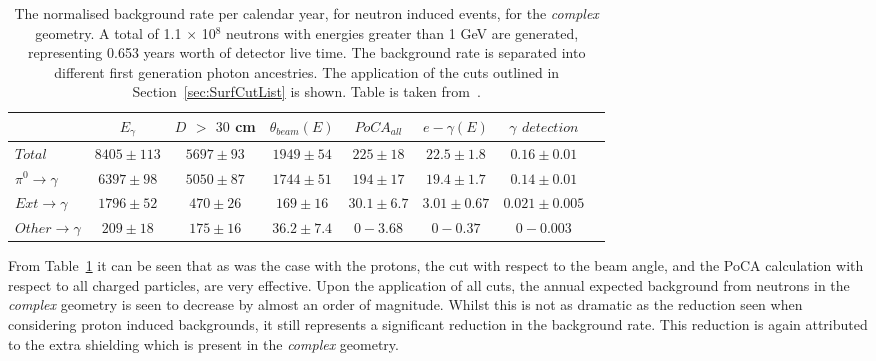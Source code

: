 \begin{table}
  \caption[The normalised background rate per calendar year, for neutron induced events, for the \emph{complex} geometry]
          {The normalised background rate per calendar year, for neutron induced events, for the \emph{complex} geometry. A total of 1.1 $\times$ 10$^8$ neutrons with energies greater than 1 GeV are generated, representing 0.653 years worth of detector live time. The background rate is separated into different first generation photon ancestries. The application of the cuts outlined in Section~\ref{sec:SurfCutList} is shown. Table is taken from~\citep{MartinsThesis}.}
  \label{tab:SurfNeuComp}
  \centering
  \scriptsize
  \begin{tabular}{l c c c c c c c }
    \toprule
        & $E_\gamma$ &  $D$ $>$ $30$ cm & $\theta_{beam}(E)$ & $PoCA_{all}$ & $e-\gamma(E)$ & $\gamma$ $detection$ \\
        \midrule
        $Total$          & $8405\pm113$ & $5697\pm93$ & $1949\pm54$  & $225\pm18$   & $22.5\pm1.8$  & $0.16\pm0.01$ \\

        $\pi^0\to\gamma$ & $6397\pm98$  & $5050\pm87$ & $1744\pm51$  & $194\pm17$   & $19.4\pm1.7$  & $0.14\pm0.01$ \\

        $Ext\to\gamma$   & $1796\pm52$  & $470\pm26$  & $169\pm16$   & $30.1\pm6.7$ & $3.01\pm0.67$ & $0.021\pm0.005$ \\

        $Other\to\gamma$ & $209\pm18$   & $175\pm16$  & $36.2\pm7.4$ & $0-3.68$     & $0-0.37$      & $0-0.003$ \\
        \bottomrule
  \end{tabular}
\end{table}

From Table~\ref{tab:SurfNeuComp} it can be seen that as was the case with the protons, the cut with respect to the beam angle, and the PoCA calculation with respect to all charged particles, are very effective. Upon the application of all cuts, the annual expected background from neutrons in the \emph{complex} geometry is seen to decrease by almost an order of magnitude. Whilst this is not as dramatic as the reduction seen when considering proton induced backgrounds, it still represents a significant reduction in the background rate. This reduction is again attributed to the extra shielding which is present in the \emph{complex} geometry. \\

